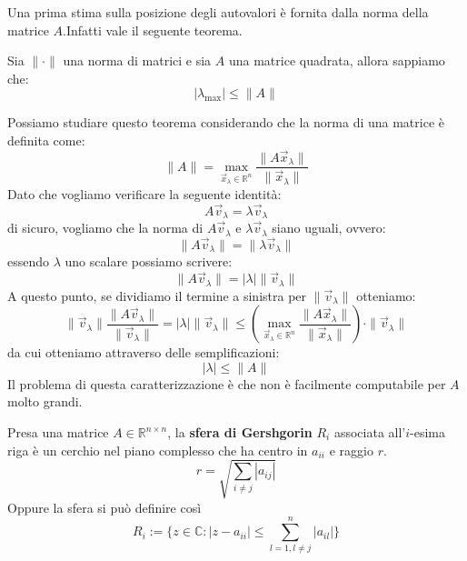 Una prima stima sulla posizione degli autovalori è fornita dalla norma della
matrice $A$.Infatti vale il seguente teorema.
\begin{teorema}
    Sia $\|\cdot\|$ una norma di matrici e sia $A$ una matrice quadrata, allora
    sappiamo che:
    \begin{equation*}
        |\lambda_{\max}| \leq \|A\|
    \end{equation*}
\end{teorema}
Possiamo studiare questo teorema considerando che la norma di una matrice è
definita come:
\begin{equation*}
    \|A\| = \max_{\vec{x}_\lambda \in \mathbb{R}^n} \frac{\|A\vec{x}_\lambda\|}{\|\vec{x}_\lambda\|}
\end{equation*}
Dato che vogliamo verificare la seguente identità:
\begin{equation*}
    A\vec{v}_\lambda = \lambda \vec{v}_\lambda
\end{equation*}
di sicuro, vogliamo che la norma di $A \vec{v}_\lambda$ e $\lambda \vec{v}_\lambda$
siano uguali, ovvero:
\begin{equation*}
    \|A\vec{v}_\lambda\| = \|\lambda \vec{v}_\lambda\|
\end{equation*}
essendo $\lambda$ uno scalare possiamo scrivere:
\begin{equation*}
    \|A\vec{v}_\lambda\| = |\lambda| \|\vec{v}_\lambda\|
\end{equation*}
A questo punto, se dividiamo il termine a sinistra per $\|\vec{v}_\lambda\|$ otteniamo:
\begin{equation*}
    \|\vec{v}_\lambda\| \frac{\|A\vec{v}_\lambda\|}{\|\vec{v}_\lambda\|} = |\lambda| \|\vec{v}_\lambda\|
    \leq \left(\max_{\vec{x}_\lambda \in \mathbb{R}^n} \frac{\|A\vec{x}_\lambda\|}{\|\vec{x}_\lambda\|}\right) \cdot \|\vec{v}_\lambda\|
\end{equation*}
da cui otteniamo attraverso delle semplificazioni:
\begin{equation*}
    |\lambda| \leq \|A\|
\end{equation*}
Il problema di questa caratterizzazione è che non è facilmente computabile per
$A$ molto grandi.

\begin{definizione} 
    Presa una matrice $A\in \mathbb{R}^{n\times n}$, la \textbf{sfera di Gershgorin} $R_i$
    associata all'$i$-esima riga è un cerchio nel piano complesso che ha centro
    in $a_{ii}$ e raggio $r$.
    $$r = \sqrt{\sum_{i\ne j}|a_{ij}|}$$
    Oppure la sfera si può definire così $$R_i:=\{z\in \mathbb{C}:
        |z-a_{ii}| \leq \sum_{l=1, l\neq j}^{n} |a_{il}|\}$$
\end{definizione}

